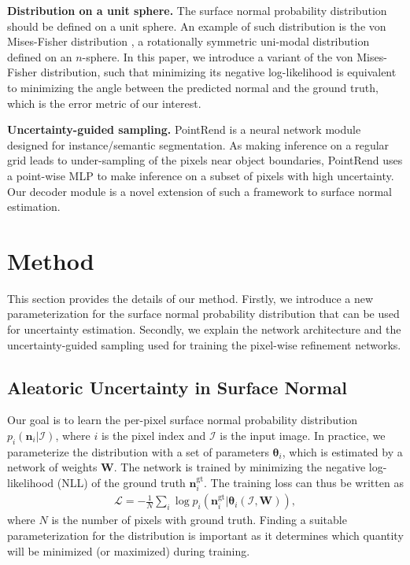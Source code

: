 \documentclass[10pt,twocolumn,letterpaper]{article}
\begin{document}
\noindent
\textbf{Distribution on a unit sphere.} The surface normal probability distribution should be defined on a unit sphere. An example of such distribution is the von Mises-Fisher distribution \cite{fisher1993statistical}, a rotationally symmetric uni-modal distribution defined on an $n$-sphere. In this paper, we introduce a variant of the von Mises-Fisher distribution, such that minimizing its negative log-likelihood is equivalent to minimizing the angle between the predicted normal and the ground truth, which is the error metric of our interest.

\noindent
\textbf{Uncertainty-guided sampling.} PointRend \cite{pointrend} is a neural network module designed for instance/semantic segmentation. As making inference on a regular grid leads to under-sampling of the pixels near object boundaries, PointRend uses a point-wise MLP to make inference on a subset of pixels with high uncertainty. Our decoder module is a novel extension of such a framework to surface normal estimation.

\section{Method}
\label{sec:method}

This section provides the details of our method. Firstly, we introduce a new parameterization for the surface normal probability distribution that can be used for uncertainty estimation. Secondly, we explain the network architecture and the uncertainty-guided sampling used for training the pixel-wise refinement networks.

\subsection{Aleatoric Uncertainty in Surface Normal}
\label{sec:method1}

Our goal is to learn the per-pixel surface normal probability distribution $p_i(\mathbf{n}_i|\mathcal{I})$, where $i$ is the pixel index and $\mathcal{I}$ is the input image. In practice, we parameterize the distribution with a set of parameters $\boldsymbol{\theta}_i$, which is estimated by a network of weights $\mathbf{W}$. The network is trained by minimizing the negative log-likelihood (NLL) of the ground truth $\mathbf{n}_i^\text{gt}$. The training loss can thus be written as
\begin{align}
    \label{eqn:aleatoric_loss}
    \mathcal{L} = - \frac{1}{N} \sum_i \log p_i(\mathbf{n}^\text{gt}_i|
    \boldsymbol{\theta}_i(\mathcal{I},\mathbf{W})
    ),
\end{align}
\noindent
where $N$ is the number of pixels with ground truth. Finding a suitable parameterization for the distribution is important as it determines which quantity will be minimized (or maximized) during training.
\end{document}
